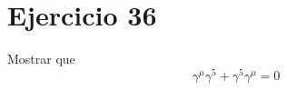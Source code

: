 \section*{Ejercicio 36}
Mostrar que
\begin{equation*}
    \gamma^\mu \gamma^5 + \gamma^5 \gamma^\mu  =0
\end{equation*}